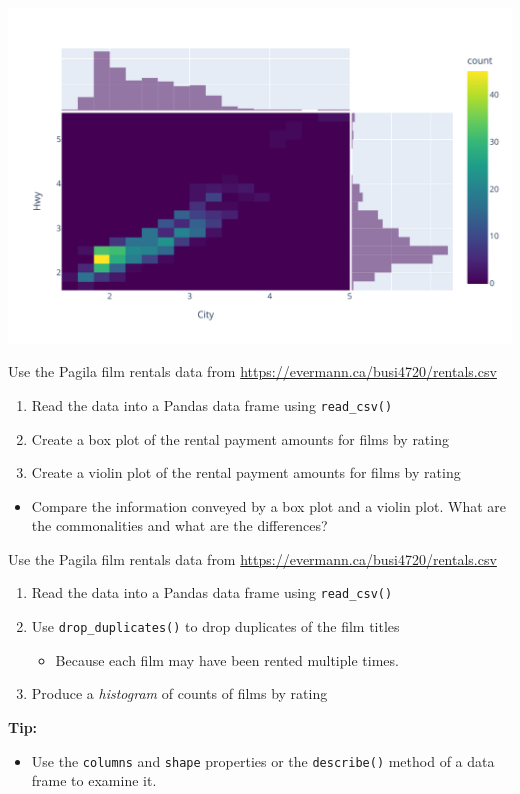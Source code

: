\begin{center}
  \includegraphics[width=.8\textwidth]{px.heatmap.pdf}
\end{center}


\begin{exercisebox}
Use the Pagila film rentals data from \url{https://evermann.ca/busi4720/rentals.csv}
\begin{enumerate}
   \item Read the data into a Pandas data frame using \texttt{read\_csv()}
   \item Create a box plot of the rental payment amounts for films by rating
   \item Create a violin plot of the rental payment amounts for films by rating
\end{enumerate}
\begin{itemize}
\item Compare the information conveyed by a box plot and a violin plot. What are the commonalities and what are the differences?
\end{itemize}
\end{exercisebox}

\begin{exercisebox}
Use the Pagila film rentals data from \small\url{https://evermann.ca/busi4720/rentals.csv}\normalsize
\begin{enumerate}
   \item Read the data into a Pandas data frame using \texttt{read\_csv()}
   \item Use \texttt{drop\_duplicates()} to drop duplicates of the film titles
   \begin{itemize}
      \item Because each film may have been rented multiple times.
   \end{itemize}
   \item Produce a \emph{histogram} of counts of films by rating
\end{enumerate}
\vspace{\baselineskip}
\textbf{Tip:}
\begin{itemize}
\item Use the \texttt{columns} and \texttt{shape} properties or the \texttt{describe()} method of a data frame to examine it. 
\end{itemize}
\end{exercisebox}

